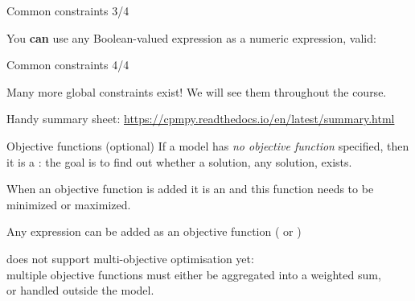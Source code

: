 \documentclass{cons-beamer}
\begin{document}
\begin{flashcardcpmpy}
\begin{frame}{Common constraints 3/4}
  \begin{example}
    \vspace{-0.5em}
    
    \vspace{-0.5em}
  \end{example}
  You \textbf{can} use any Boolean-valued expression as a numeric expression, \eg valid: 
\end{frame}

\begin{frame}{Common constraints 4/4}
  \begin{example}
    \vspace{-0.5em}
    
    \vspace{-0.5em}
  \end{example}
  Many more global constraints exist! We will see them throughout the course.

  \vspace{1em}
  \begin{footnotesize}
    Handy summary sheet: \url{https://cpmpy.readthedocs.io/en/latest/summary.html}

  \end{footnotesize}

\end{frame} 

\begin{frame}{Objective functions (optional)}
  If a model has \textit{no objective function} specified, then it is a : the goal is to find out whether a solution, any solution, exists. 

  When an objective function is added it is an  and this function needs to be minimized or maximized.

  \begin{example}
    \vspace{-0.5em}
    
  \end{example}
  Any expression can be added as an objective function ( or )

  \vspace{1em}
  \CPMpy does not support multi-objective optimisation yet: \\ multiple
  objective functions must either be aggregated into a weighted sum, \\
  or handled outside the model.
\end{frame}


\end{flashcardcpmpy}
\end{document}
